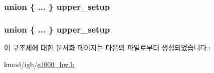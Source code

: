 \subsubsection[{\texorpdfstring{upper\+\_\+setup}{upper_setup}}]{\setlength{\rightskip}{0pt plus 5cm}union \{ ... \}   upper\+\_\+setup}\hypertarget{structe1000__context__desc_a0f15771f8f7de41ac83addb11be22c3b}{}\label{structe1000__context__desc_a0f15771f8f7de41ac83addb11be22c3b}
\subsubsection[{\texorpdfstring{upper\+\_\+setup}{upper_setup}}]{\setlength{\rightskip}{0pt plus 5cm}union \{ ... \}   upper\+\_\+setup}\hypertarget{structe1000__context__desc_ac973d2fb662c4d24d684f53d59d513d9}{}\label{structe1000__context__desc_ac973d2fb662c4d24d684f53d59d513d9}


이 구조체에 대한 문서화 페이지는 다음의 파일로부터 생성되었습니다.\+:\begin{DoxyCompactItemize}
\item 
kmod/igb/\hyperlink{kmod_2igb_2e1000__hw_8h}{e1000\+\_\+hw.\+h}\end{DoxyCompactItemize}
